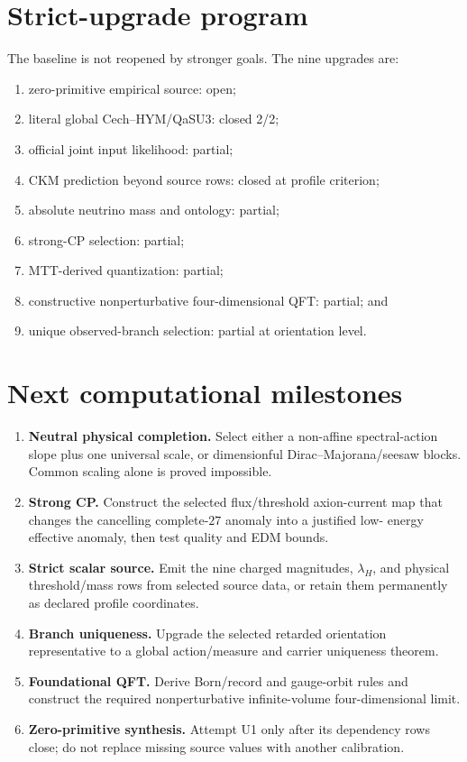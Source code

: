 \documentclass[11pt]{article}
\begin{document}
\section{Strict-upgrade program}

The baseline is not reopened by stronger goals. The nine upgrades are:
\begin{enumerate}
\item[U1.] zero-primitive empirical source: open;
\item[U2.] literal global Cech--HYM/QaSU3: closed 2/2;
\item[U3.] official joint input likelihood: partial;
\item[U4.] CKM prediction beyond source rows: closed at profile criterion;
\item[U5.] absolute neutrino mass and ontology: partial;
\item[U6.] strong-CP selection: partial;
\item[U7.] MTT-derived quantization: partial;
\item[U8.] constructive nonperturbative four-dimensional QFT: partial; and
\item[U9.] unique observed-branch selection: partial at orientation level.
\end{enumerate}

\section{Next computational milestones}

\begin{enumerate}
\item \textbf{Neutral physical completion.} Select either a non-affine
spectral-action slope plus one universal scale, or dimensionful
Dirac--Majorana/seesaw blocks. Common scaling alone is proved impossible.
\item \textbf{Strong CP.} Construct the selected flux/threshold axion-current
map that changes the cancelling complete-$27$ anomaly into a justified low-
energy effective anomaly, then test quality and EDM bounds.
\item \textbf{Strict scalar source.} Emit the nine charged magnitudes,
$\lambda_H$, and physical threshold/mass rows from selected source data, or
retain them permanently as declared profile coordinates.
\item \textbf{Branch uniqueness.} Upgrade the selected retarded orientation
representative to a global action/measure and carrier uniqueness theorem.
\item \textbf{Foundational QFT.} Derive Born/record and gauge-orbit rules and
construct the required nonperturbative infinite-volume four-dimensional
limit.
\item \textbf{Zero-primitive synthesis.} Attempt U1 only after its dependency
rows close; do not replace missing source values with another calibration.
\end{enumerate}
\end{document}
